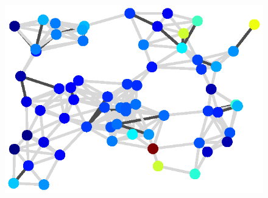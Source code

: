 \begin{figure}[t]
\begin{center}
\begin{minipage}{0.95\textwidth}
\begin{minipage}[t]{0.17\textwidth}
                \centering
                \includegraphics[width=\linewidth]{figures/restored/proposed_2}
            \end{minipage}\hspace{2em}
            \begin{minipage}[t]{0.05\textwidth}
                \centering
            \end{minipage}
        \end{minipage}
    \end{center}
    

\end{figure}
